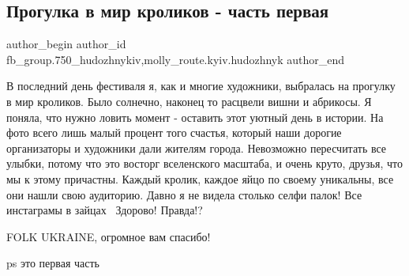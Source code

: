  
 
 
 
 

\subsection{Прогулка в мир кроликов - часть первая}
\label{sec:24_04_2018.fb.fb_group.750_hudozhnykiv.1.progulka_v_mir_krolikov_one}
 
\ifcmt
 author_begin
   author_id fb_group.750_hudozhnykiv,molly_route.kyiv.hudozhnyk
 author_end
\fi

В последний день фестиваля я, как и многие художники, выбралась на прогулку в
мир кроликов. Было солнечно, наконец то расцвели вишни и абрикосы. Я поняла,
что нужно ловить момент - оставить этот уютный день в истории. На фото всего
лишь малый процент того счастья, который наши дорогие организаторы и художники
дали жителям города. Невозможно пересчитать все улыбки, потому что это восторг
вселенского масштаба, и очень круто, друзья, что мы к этому причастны. Каждый
кролик, каждое яйцо по своему уникальны, все они нашли свою аудиторию. Давно я
не видела столько селфи палок! Все инстаграмы в зайцах🐇🐇🐇Здорово! Правда!?

FOLK UKRAINE, огромное вам спасибо!

ps это первая часть

